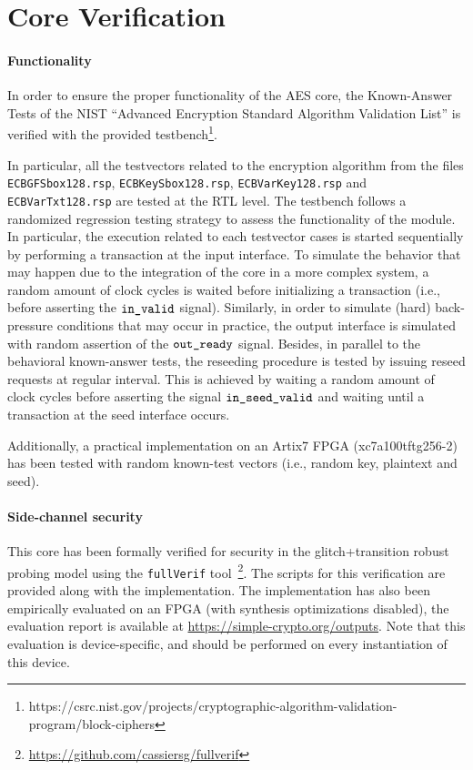 \documentclass{scrartcl}
\begin{document}
\section{Core Verification}
\label{section:verif}
\paragraph{Functionality}
In order to ensure the proper functionality of the AES core, the Known-Answer
Tests of the NIST ``Advanced Encryption Standard Algorithm Validation List'' is
verified with the provided
testbench\footnote{https://csrc.nist.gov/projects/cryptographic-algorithm-validation-program/block-ciphers}.

In particular, all the testvectors related to the
encryption algorithm from the files \texttt{ECBGFSbox128.rsp},
\texttt{ECBKeySbox128.rsp}, \texttt{ECBVarKey128.rsp} and
\texttt{ECBVarTxt128.rsp} are tested at the RTL level. The
testbench follows a randomized regression testing strategy to assess the
functionality of the module. In particular, the execution related to each
testvector cases is started sequentially by performing a transaction
at the input interface.  To simulate the behavior that may happen due to the
integration of the core in a more complex system, a random amount of clock
cycles is waited before initializing a transaction (i.e., before asserting the
$\texttt{in\_valid}$ signal). Similarly, in order to simulate (hard) back-pressure conditions that may occur
in practice, the output interface is simulated with random
assertion of the $\texttt{out\_ready}$ signal. Besides, in
parallel to the behavioral known-answer tests, the reseeding procedure is
tested by issuing reseed requests at regular interval. This is achieved by 
waiting a random amount of clock cycles before asserting the signal
$\texttt{in\_seed\_valid}$ and waiting until a transaction at the seed interface occurs.

Additionally, a practical implementation on an Artix7 FPGA (xc7a100tftg256-2)
has been tested with random known-test vectors (i.e., random key, plaintext and seed).  

\paragraph{Side-channel security}
This core has been formally verified for security in the glitch+transition
robust probing model using the \texttt{fullVerif}%
tool~\cite{DBLP:journals/tc/CassiersGLS21,DBLP:journals/tches/CassiersS21}\footnote{\url{https://github.com/cassiersg/fullverif}}.
The scripts for this verification are provided along with the implementation.
The implementation has also been empirically evaluated on an FPGA (with
synthesis optimizations disabled), the evaluation report is available at
\url{https://simple-crypto.org/outputs}. Note that this evaluation is
device-specific, and should be performed on every instantiation of this device.
\end{document}
